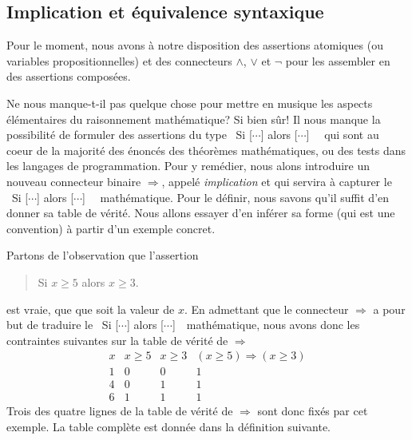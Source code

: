 \documentclass[french,course,oneside,theoremnosection]{lecture}
\newcommand{\iimplies}{\Rightarrow}
\begin{document}
\subsection{Implication et équivalence syntaxique}

Pour le moment, nous avons à notre disposition des assertions atomiques (ou variables propositionnelles) et des connecteurs $\wedge$, $\vee$ et $\neg$ pour les assembler en des assertions composées. 

Ne nous manque-t-il pas quelque chose pour mettre en musique les aspects élémentaires du raisonnement mathématique? Si bien sûr! Il nous manque la possibilité de formuler des assertions du type \og~Si [$\cdots$] alors [$\cdots$]~\fg{}~ qui sont au coeur de la majorité des énoncés des théorèmes mathématiques, ou  des tests dans les langages de programmation. Pour y remédier, nous alons introduire un nouveau connecteur binaire $\iimplies$, appelé \emph{implication} et qui servira à capturer le 
\og~Si [$\cdots$] alors [$\cdots$]~\fg{}~ mathématique. Pour le définir, nous savons qu'il suffit d'en donner sa table de vérité. Nous allons essayer d'en inférer sa forme (qui est une convention) à partir d'un exemple concret.

\begin{example}\label{ex:imp}
Partons de l'observation que l'assertion 
\begin{quotation}
Si $x\geq 5$ alors $x\geq 3$.
\end{quotation}
est vraie, que que soit la valeur de $x$. En admettant que le connecteur $\iimplies$ a pour but de traduire le \og~Si [$\cdots$] alors [$\cdots$]~\fg{}~mathématique, nous avons donc les contraintes suivantes sur la table de vérité de $\iimplies$
\[
\begin{array}{c|c|c|c}
x & x\geq 5& x\geq 3 & (x \geq 5) \iimplies (x \geq 3)\\\hline
1 & 0 & 0 & 1\\
4 & 0 & 1 & 1\\
6 & 1 & 1 & 1
\end{array}
\]
Trois des quatre lignes de la table de vérité de $\iimplies$ sont donc fixés par cet exemple. La table complète est donnée dans la définition suivante. 
\end{example}
\end{document}
